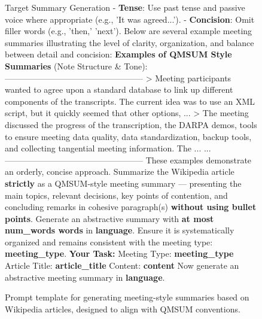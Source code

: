 \begin{figure*}[t]
\begin{AIbox}{Target Summary Generation}
{        - \textbf{Tense}: Use past tense and passive voice where appropriate (e.g., 'It was agreed...'). \newline
        - \textbf{Concision}: Omit filler words (e.g., 'then,' 'next'). \newline
        Below are several example meeting summaries illustrating the level of clarity, organization, and balance between detail and concision: \newline
        \textbf{Examples of QMSUM Style Summaries} (Note Structure \& Tone): \newline
        -------------------------------------------------- \newline
        > Meeting participants wanted to agree upon a standard database to link up different components of the transcripts. The current idea was to use an XML script, but it quickly seemed that other options, ... \newline
        > The meeting discussed the progress of the transcription, the DARPA demos, tools to ensure meeting data quality, data standardization, backup tools, and collecting tangential meeting information. The ... \newline
        ...\newline
        -------------------------------------------------- \newline
        These examples demonstrate an orderly, concise approach. Summarize the Wikipedia article \textbf{strictly} as a QMSUM-style meeting summary — presenting the main topics, relevant decisions, key points of contention, and concluding remarks in cohesive paragraph(s) \textbf{without using bullet points}. \newline
        \newline
        Generate an abstractive summary with \textbf{at most {num\_words} words} in \textbf{{language}}. Ensure it is systematically organized and remains consistent with the meeting type: \textbf{{meeting\_type}}. \newline
        \textbf{Your Task:} \newline
        Meeting Type: \textbf{{meeting\_type}} \newline
        Article Title: \textbf{{article\_title}} \newline
        Content: \textbf{{content}} \newline
        Now generate an abstractive meeting summary in \textbf{{language}}. \newline
    }
    \end{AIbox}
    \caption{Prompt template for generating meeting-style summaries based on Wikipedia articles, designed to align with QMSUM conventions.}
    \label{fig:target_summary_prompt}
\end{figure*}


